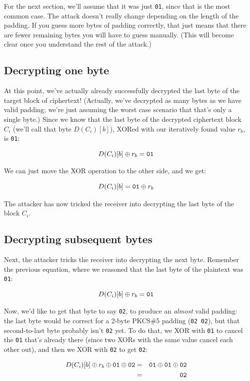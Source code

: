 \documentclass[11pt,ebook,table,dvipsnames]{memoir}
\begin{document}
For the next section, we'll assume that it was just \verb~01~, since that
is the most common case. The attack doesn't really change depending on
the length of the padding. If you guess more bytes of padding
correctly, that just means that there are fewer remaining bytes you
will have to guess manually. (This will become clear once you
understand the rest of the attack.)
\subsection{Decrypting one byte}
\label{sec-2-3-7-3}

At this point, we've actually already successfully decrypted the last
byte of the target block of ciphertext! (Actually, we've decrypted as
many bytes as we have valid padding; we're just assuming the worst
case scenario that that's only a single byte.) Since we know that the
last byte of the decrypted ciphertext block $C_i$ (we'll call that
byte $D(C_i)[b]$), XORed with our iteratively found value $r_b$, is
\verb|01|:

\[
D(C_i)[b] \oplus r_b = \mathtt{01}
\]

We can just move the XOR operation to the other side, and we get:

\[
D(C_i)[b] = \mathtt{01} \oplus r_b
\]

The attacker has now tricked the receiver into decrypting the last
byte of the block $C_i$.
\subsection{Decrypting subsequent bytes}
\label{sec-2-3-7-4}

Next, the attacker tricks the receiver into decrypting the next byte.
Remember the previous equation, where we reasoned that the last byte
of the plaintext was \verb~01~:

\[
D(C_i)[b] \oplus r_b = \mathtt{01}
\]

Now, we'd like to get that byte to say \verb~02~, to produce an \emph{almost}
valid padding: the last byte would be correct for a 2-byte PKCS\#5
padding (\verb~02 02~), but that second-to-last byte probably isn't \verb~02~
yet. To do that, we XOR with \verb~01~ to cancel the \verb~01~ that's already
there (since two XORs with the same value cancel each other out), and
then we XOR with \verb~02~ to get \verb~02~:

\begin{eqnarray*}
D(C_i)[b] \oplus r_b \oplus \mathtt{01} \oplus \mathtt{02} & = & \mathtt{01} \oplus \mathtt{01} \oplus \mathtt{02} \\
& = & \mathtt{02}
\end{eqnarray*}
\end{document}
